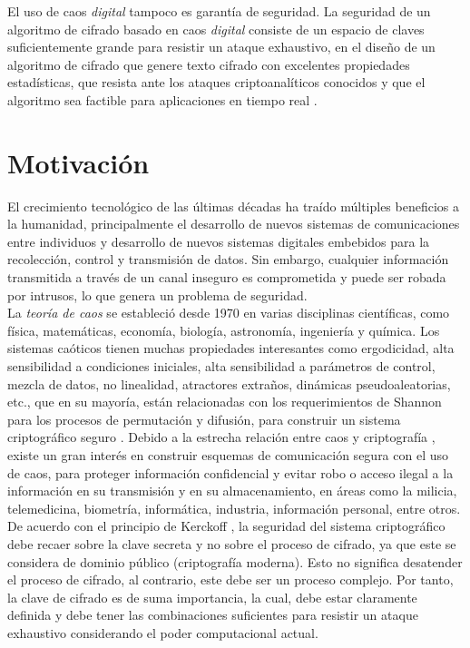 El uso de caos \textit{digital} tampoco es garantía de seguridad. La seguridad de un algoritmo de cifrado basado en caos \textit{digital} consiste de un espacio de claves suficientemente grande para resistir un ataque exhaustivo, en el diseño de un algoritmo de cifrado que genere texto cifrado con excelentes propiedades estadísticas, que resista ante los ataques criptoanalíticos conocidos y que el algoritmo sea factible para aplicaciones en tiempo real \cite{AEtAl_2009}.  \\

\section{Motivación}
El crecimiento tecnológico de las últimas décadas ha traído múltiples beneficios a la humanidad, principalmente el desarrollo de nuevos sistemas de comunicaciones entre individuos y desarrollo de nuevos sistemas digitales embebidos para la recolección, control y transmisión de datos. Sin embargo, cualquier información transmitida a través de un canal inseguro es comprometida y puede ser robada por intrusos, lo que genera un problema de seguridad.\\ 

La \textit{teoría de caos} se estableció desde 1970 en varias disciplinas científicas, como física, matemáticas, economía, biología, astronomía, ingeniería y química. Los sistemas caóticos tienen muchas propiedades interesantes como ergodicidad, alta sensibilidad a condiciones iniciales, alta sensibilidad a parámetros de control, mezcla de datos, no linealidad, atractores extraños, dinámicas pseudoaleatorias, etc., que en su mayoría, están relacionadas con los requerimientos de Shannon para los procesos de permutación y difusión, para construir un sistema criptográfico seguro \cite{S_1948, S_1949}. Debido a la estrecha relación entre caos y criptografía \cite{ByC_1996, F_1998, AEtAl_1999}, existe un gran interés en construir esquemas de comunicación segura con el uso de caos, para proteger información confidencial y evitar robo o acceso ilegal a la información en su transmisión y en su almacenamiento, en áreas como la milicia, telemedicina, biometría, informática, industria, información personal, entre otros. \\

De acuerdo con el principio de Kerckoff \cite{P_2011}, la seguridad del sistema criptográfico debe recaer sobre la clave secreta y no sobre el proceso de cifrado, ya que este se considera de dominio público (criptografía moderna). Esto no significa desatender el proceso de cifrado, al contrario, este debe ser un proceso complejo. Por tanto, la clave de cifrado es de suma importancia, la cual, debe estar claramente definida y debe tener las combinaciones suficientes para resistir un ataque exhaustivo considerando el poder computacional actual.  \\

